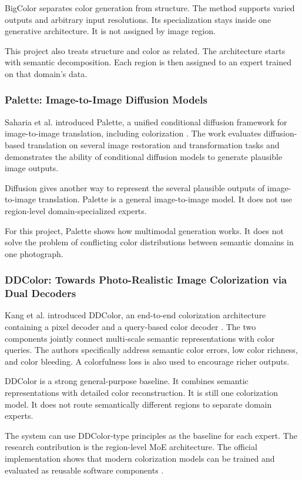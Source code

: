 \documentclass{FastFyp}
\begin{document}
BigColor separates color generation from structure. The method supports varied outputs and arbitrary input resolutions. Its specialization stays inside one generative architecture. It is not assigned by image region.

This project also treats structure and color as related. The architecture starts with semantic decomposition. Each region is then assigned to an expert trained on that domain's data.

\subsubsection{Palette: Image-to-Image Diffusion Models}

Saharia et al. introduced Palette, a unified conditional diffusion framework for image-to-image translation, including colorization \cite{ref8}. The work evaluates diffusion-based translation on several image restoration and transformation tasks and demonstrates the ability of conditional diffusion models to generate plausible image outputs.

Diffusion gives another way to represent the several plausible outputs of image-to-image translation. Palette is a general image-to-image model. It does not use region-level domain-specialized experts.

For this project, Palette shows how multimodal generation works. It does not solve the problem of conflicting color distributions between semantic domains in one photograph.

\subsubsection{DDColor: Towards Photo-Realistic Image Colorization via Dual Decoders}

Kang et al. introduced DDColor, an end-to-end colorization architecture containing a pixel decoder and a query-based color decoder \cite{ref9}. The two components jointly connect multi-scale semantic representations with color queries. The authors specifically address semantic color errors, low color richness, and color bleeding. A colorfulness loss is also used to encourage richer outputs.

DDColor is a strong general-purpose baseline. It combines semantic representations with detailed color reconstruction. It is still one colorization model. It does not route semantically different regions to separate domain experts.

The system can use DDColor-type principles as the baseline for each expert. The research contribution is the region-level MoE architecture. The official implementation shows that modern colorization models can be trained and evaluated as reusable software components \cite{ref10}.
\end{document}
